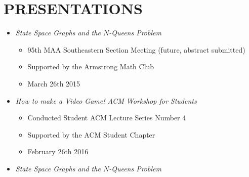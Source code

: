 \documentclass[11pt]{article} %
\begin{document}
\section*{PRESENTATIONS}
\begin{itemize}
  \setlength{\itemsep}{1pt}
  \setlength{\parskip}{0pt}
  \setlength{\parsep}{0pt}

\item \textit{State Space Graphs and the $N$-Queens Problem} 
  \begin{itemize}
	  	\setlength{\itemsep}{1pt}
  		\setlength{\parskip}{0pt}
 	 	\setlength{\parsep}{0pt}
	\item 95th MAA Southeastern Section Meeting (future, abstract submitted)
	\item Supported by the Armstrong Math Club
	\item March 26th 2015
	\end{itemize}
	  \item \textit{How to make a Video Game! ACM Workshop for Students} 
  \begin{itemize}
	  	\setlength{\itemsep}{1pt}
  		\setlength{\parskip}{0pt}
 	 	\setlength{\parsep}{0pt}
		\item Conducted Student ACM Lecture Series Number 4
	\item Supported by the ACM Student Chapter
	\item February 26th 2016
	\end{itemize}
\item \textit{State Space Graphs and the $N$-Queens Problem} 


\end{itemize}
\end{document}
